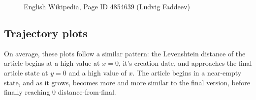 \begin{figure}
  \caption{English Wikipedia, Page ID 4854639 (Ludvig Faddeev)}
  \label{fig:one-weight-gradient}
\end{figure}

\subsection*{Trajectory plots}
On average, these plots follow a similar pattern: the Levenshtein
distance of the article begins at a high value at $x=0$, it's creation
date, and approaches the final article state at $y=0$ and a high value
of $x$. The article begins in a near-empty state, and as it grows,
becomes more and more similar to the final version, before finally
reaching $0$ distance-from-final. 

